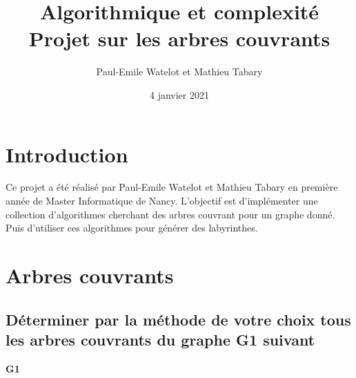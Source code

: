 \documentclass[11pt]{article}
\title{Algorithmique et complexité Projet sur les arbres couvrants}
\author{Paul-Emile Watelot et Mathieu Tabary}
\date{4 janvier 2021}
\begin{document}
    \maketitle

    \section{Introduction}\label{sec:introduction}
        Ce projet a été réalisé par Paul-Emile Watelot et Mathieu Tabary en première année de Master Informatique de Nancy.
        L'objectif est d'implémenter une collection d'algorithmes cherchant des arbres couvrant pour un graphe donné.
        Puis d'utiliser ces algorithmes pour générer des labyrinthes.
    
    \section{Arbres couvrants}\label{sec:arbres-couvrants}
        \subsection{Déterminer par la méthode de votre choix tous les arbres couvrants du graphe G1 suivant}\label{subsec:Q1}
        \begin{center}

            \textbf{G1}

        \end{center}
\end{document}
